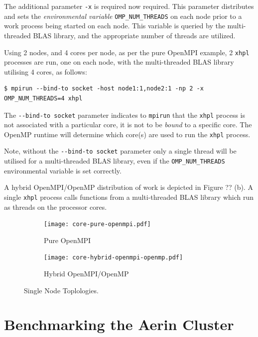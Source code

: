 \documentclass{report}
\begin{document}
The additional parameter \verb|-x| is required now required. This parameter distributes and sets the \emph{environmental variable} \verb|OMP_NUM_THREADS| on each node prior to a work process being started on each node. This variable is queried by the multi-threaded BLAS library, and the appropriate number of threads are utilized.

Using 2 nodes, and 4 cores per node, as per the pure OpenMPI example, 2 \verb|xhpl| processes are run, one on each node, with the multi-threaded BLAS library utilising 4 cores, as follows:

\lstset{style=type}
\begin{lstlisting}
$ mpirun --bind-to socket -host node1:1,node2:1 -np 2 -x OMP_NUM_THREADS=4 xhpl
\end{lstlisting}

The \verb|--bind-to socket| parameter indicates to \verb|mpirun| that the \verb|xhpl| process is not associated with a particular core, it is not to be \emph{bound} to a specific core. The OpenMP runtime will determine which core(s) are used to run the \verb|xhpl| process.

Note, without the \verb|--bind-to socket| parameter only a single thread will be utilised for a multi-threaded BLAS library, even if the \verb|OMP_NUM_THREADS| environmental variable is set correctly.

A hybrid OpenMPI/OpenMP distribution of work is depicted in Figure ?? (b). A single \verb|xhpl| process calls functions from a multi-threaded BLAS library which run as threads on the processor cores.

\begin{figure}
	\begin{subfigure}{1.0\textwidth}
		\centering
		\texttt{[image: core-pure-openmpi.pdf]}
		\caption{Pure OpenMPI}
		\label{fig:subim1}
	\end{subfigure}
	\par\bigskip
	\begin{subfigure}{1.0\textwidth}
		\centering
		\texttt{[image: core-hybrid-openmpi-openmp.pdf]}
		\caption{Hybrid OpenMPI/OpenMP}
		\label{fig:subim2}
	\end{subfigure}
\caption{Single Node Toplologies.}
\label{fig:image2}
\end{figure}



%
%
\chapter{Benchmarking the Aerin Cluster}
\end{document}
